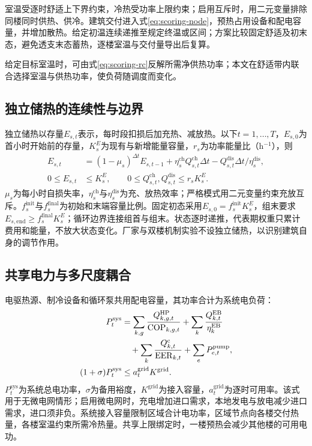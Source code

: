 室温受逐时舒适上下界约束，冷热受功率上限约束；启用互斥时，用二元变量排除同楼同时供热、供冷。建筑交付进入式\eqref{eq:scoring-node}，预热占用设备和配电容量，并增加散热。给定初温连续递推至规定终温或区间；方案比较固定舒适及初末态，避免透支末态蓄热，逐楼室温与交付量导出后复算。

给定目标室温时，可由式\eqref{eq:scoring-rc}反解所需净供热功率；本文在舒适带内联合选择室温与供热功率，使负荷随调度而变化。

\subsection{独立储热的连续性与边界}

独立储热以存量$E_{s,t}$表示，每时段扣损后加充热、减放热。以下$t=1,\ldots,T$，$E_{s,0}$为首小时开始前的存量，$K_s^E$为现有与新增能量容量，$r_s$为功率能量比（h$^{-1}$），则
\begin{align}
E_{s,t}
&=(1-\mu_s)^{\Delta t}E_{s,t-1}
+\eta_s^{\mathrm{ch}}Q_{s,t}^{\mathrm{ch}}\Delta t
-Q_{s,t}^{\mathrm{dis}}\Delta t/\eta_s^{\mathrm{dis}},
\label{eq:scoring-storage}\\
0\leq E_{s,t}&\leq K_s^E,\qquad
0\leq Q_{s,t}^{\mathrm{ch}},Q_{s,t}^{\mathrm{dis}}\leq r_sK_s^E .
\end{align}
$\mu_s$为每小时自损失率，$\eta_s^{\mathrm{ch}}$与$\eta_s^{\mathrm{dis}}$为充、放热效率；严格模式用二元变量约束充放互斥。$f_s^{\mathrm{init}}$与$f_s^{\mathrm{final}}$为初始和末端容量比例。固定初态采用$E_{s,0}=f_s^{\mathrm{init}}K_s^E$，组末要求$E_{s,\mathrm{end}}\geq f_s^{\mathrm{final}}K_s^E$；循环边界连接组首与组末。状态逐时递推，代表期权重只累计费用和能量，不放大状态变化。厂家与双楼机制实验不设独立储热，以识别建筑自身的调节作用。

\subsection{共享电力与多尺度耦合}

电驱热源、制冷设备和循环泵共用配电容量，其功率合计为系统电负荷：
\begin{align}
P_t^{\mathrm{sys}}
&=\sum_{k,g}\frac{Q_{k,g,t}^{\mathrm{HP}}}{\mathrm{COP}_{k,g,t}}
+\sum_k\frac{Q_{k,t}^{\mathrm{EB}}}{\eta_k^{\mathrm{EB}}}
\notag\\
&\quad+\sum_k\frac{Q_{k,t}^{\mathrm c}}{\mathrm{EER}_{k,t}}
+\sum_eP_{e,t}^{\mathrm{pump}},
\notag\\
(1+\sigma)P_t^{\mathrm{sys}}&\leq a_t^{\mathrm{grid}}K^{\mathrm{grid}}.
\label{eq:scoring-electric}
\end{align}
$P_t^{\mathrm{sys}}$为系统总电功率，$\sigma$为备用裕度，$K^{\mathrm{grid}}$为接入容量，$a_t^{\mathrm{grid}}$为逐时可用率。该式用于无微电网情形；启用微电网时，充电增加进口需求，本地发电与放电减少进口需求，进口须非负。系统接入容量限制区域合计电功率，区域节点向各楼交付热量，各楼室温约束所需冷热量。共享上限绑定时，一楼预热会减少其他楼的可用电功。

